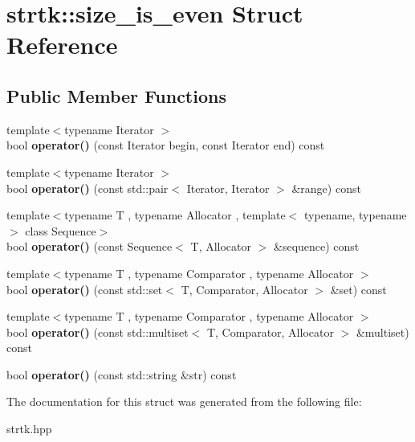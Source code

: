 \hypertarget{structstrtk_1_1size__is__even}{\section{strtk\-:\-:size\-\_\-is\-\_\-even Struct Reference}
\label{structstrtk_1_1size__is__even}
}
\subsection*{Public Member Functions}
\begin{DoxyCompactItemize}
\item 
\hypertarget{structstrtk_1_1size__is__even_a85795e999f164fb4e4560604b5fc19b2}{{\footnotesize template$<$typename Iterator $>$ }\\bool {\bfseries operator()} (const Iterator begin, const Iterator end) const }\label{structstrtk_1_1size__is__even_a85795e999f164fb4e4560604b5fc19b2}

\item 
\hypertarget{structstrtk_1_1size__is__even_a2a8400a71d3f772ec07e2daca467ee48}{{\footnotesize template$<$typename Iterator $>$ }\\bool {\bfseries operator()} (const std\-::pair$<$ Iterator, Iterator $>$ \&range) const }\label{structstrtk_1_1size__is__even_a2a8400a71d3f772ec07e2daca467ee48}

\item 
\hypertarget{structstrtk_1_1size__is__even_ac2304b11a8a5e7c3ec428bd5f6e82be8}{{\footnotesize template$<$typename T , typename Allocator , template$<$ typename, typename $>$ class Sequence$>$ }\\bool {\bfseries operator()} (const Sequence$<$ T, Allocator $>$ \&sequence) const }\label{structstrtk_1_1size__is__even_ac2304b11a8a5e7c3ec428bd5f6e82be8}

\item 
\hypertarget{structstrtk_1_1size__is__even_a442c2f437aa3f02f33fa083899b98ba9}{{\footnotesize template$<$typename T , typename Comparator , typename Allocator $>$ }\\bool {\bfseries operator()} (const std\-::set$<$ T, Comparator, Allocator $>$ \&set) const }\label{structstrtk_1_1size__is__even_a442c2f437aa3f02f33fa083899b98ba9}

\item 
\hypertarget{structstrtk_1_1size__is__even_a6ef39fa0202a16ec9a90ee19c2227dde}{{\footnotesize template$<$typename T , typename Comparator , typename Allocator $>$ }\\bool {\bfseries operator()} (const std\-::multiset$<$ T, Comparator, Allocator $>$ \&multiset) const }\label{structstrtk_1_1size__is__even_a6ef39fa0202a16ec9a90ee19c2227dde}

\item 
\hypertarget{structstrtk_1_1size__is__even_a149bc43c874b1c87e5758b6a563cc062}{bool {\bfseries operator()} (const std\-::string \&str) const }\label{structstrtk_1_1size__is__even_a149bc43c874b1c87e5758b6a563cc062}

\end{DoxyCompactItemize}


The documentation for this struct was generated from the following file\-:\begin{DoxyCompactItemize}
\item 
strtk.\-hpp\end{DoxyCompactItemize}
